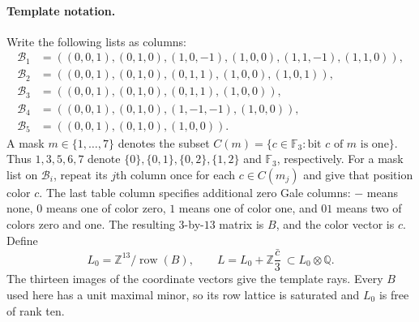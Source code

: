 \paragraph{Template notation.}
Write the following lists as columns:
\[
\begin{split}
\mathcal B_1&=((0,0,1),(0,1,0),(1,0,-1),(1,0,0),
                  (1,1,-1),(1,1,0)),\\
\mathcal B_2&=((0,0,1),(0,1,0),(0,1,1),(1,0,0),(1,0,1)),\\
\mathcal B_3&=((0,0,1),(0,1,0),(0,1,1),(1,0,0)),\\
\mathcal B_4&=((0,0,1),(0,1,0),(1,-1,-1),(1,0,0)),\\
\mathcal B_5&=((0,0,1),(0,1,0),(1,0,0)).
\end{split}                                                    \tag{TG.4}
\]
A mask $m\in\{1,\ldots,7\}$ denotes the subset
$C(m)=\{c\in\mathbb F_3:\text{bit }c\text{ of }m\text{ is one}\}$.
Thus $1,3,5,6,7$ denote $\{0\},\{0,1\},\{0,2\},\{1,2\}$
and $\mathbb F_3$, respectively.
For a mask list on $\mathcal B_i$, repeat its $j$th column once for
each $c\in C(m_j)$ and give that position color $c$.
The last table column specifies additional zero Gale columns:
$-$ means none, $0$ means one of color zero, $1$ means one of color
one, and $01$ means two of colors zero and one.
The resulting $3$-by-$13$ matrix is $B$, and the color vector is $c$.
Define
\[
 L_0=\mathbb Z^{13}/\operatorname{row}(B),\qquad
 L=L_0+\mathbb Z\frac{\bar c}{3}\ \subset L_0\otimes\mathbb Q.
                                                               \tag{TG.5}
\]
The thirteen images of the coordinate vectors give the template rays.
Every $B$ used here has a unit maximal minor, so its row lattice is
saturated and $L_0$ is free of rank ten.

